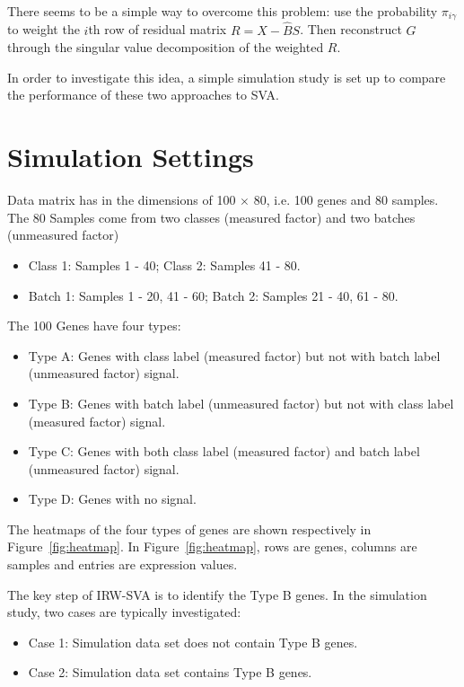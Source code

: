 \documentclass[11pt]{article}
\begin{document}
There seems to be a simple way to overcome this problem: use the probability $\pi_{i \gamma}$ to weight the $i$th row of residual matrix $R = X - \hat{B} S$. Then reconstruct $\hat{G}$ through the singular value decomposition of the weighted $R$. 


In order to investigate this idea, a simple simulation study is set up to compare the performance of these two approaches to SVA.

\section{Simulation Settings} 

Data matrix has in the dimensions of 100 $\times$ 80, i.e. 100 genes and 80 samples.  The 80 Samples come from two classes (measured factor) and two batches (unmeasured factor)
\begin{itemize} 
\item Class 1: Samples 1 - 40; Class 2: Samples 41 - 80.
\item Batch 1: Samples 1 - 20, 41 - 60; Batch 2: Samples 21 - 40, 61 - 80.
\end{itemize}
The 100 Genes have four types:
\begin{itemize}
\item Type A: Genes with class label (measured factor) but not with batch label (unmeasured factor) signal.
\item Type B: Genes with batch label (unmeasured factor) but not with class label (measured factor) signal.
\item Type C: Genes with both class label (measured factor) and batch label (unmeasured factor) signal.
\item Type D: Genes with no signal.
\end{itemize}
The heatmaps of the four types of genes are shown respectively in Figure~\ref{fig:heatmap}. In Figure~\ref{fig:heatmap}, rows are genes, columns are samples and entries are expression values. 

The key step of IRW-SVA is to identify the Type B genes. In the simulation study, two cases are typically investigated:
\begin{itemize}
\item Case 1: Simulation data set does not contain Type B genes.
\item Case 2: Simulation data set contains Type B genes.
\end{itemize}
\end{document}
